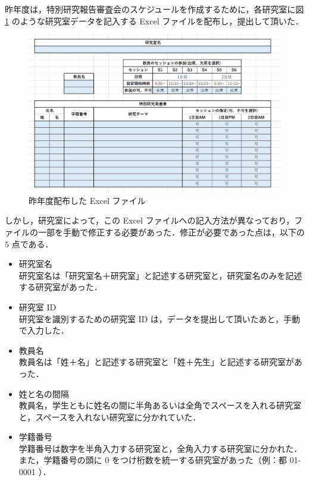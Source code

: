 \documentclass[a4paper,12pt,fleqn]{jarticle}
\begin{document}
昨年度は，特別研究報告審査会のスケジュールを作成するために，各研究室に図 \ref{fig:wakaexcel} のような研究室データを記入する Excel ファイルを配布し，提出して頂いた．
\begin{figure}[H]
  \begin{center}
    \includegraphics[scale=0.8]{wakaexcel.png}
    \caption{昨年度配布した Excel ファイル}
    \label{fig:wakaexcel}
  \end{center}
\end{figure}
しかし，研究室によって，この Excel ファイルへの記入方法が異なっており，ファイルの一部を手動で修正する必要があった．修正が必要であった点は，以下の $5$ 点である．
\begin{itemize}
\item 研究室名\\
研究室名は「研究室名＋研究室」と記述する研究室と，研究室名のみを記述する研究室があった．
\item 研究室 ID\\
研究室を識別するための研究室 ID は，データを提出して頂いたあと，手動で入力した．
\item 教員名\\
教員名は「姓＋名」と記述する研究室と「姓＋先生」と記述する研究室があった．
\item 姓と名の間隔\\
教員名，学生ともに姓名の間に半角あるいは全角でスペースを入れる研究室と，スペースを入れない研究室に分かれていた．
\item 学籍番号\\
学籍番号は数字を半角入力する研究室と，全角入力する研究室に分かれた．また，学籍番号の頭に 0 をつけ桁数を統一する研究室があった（例：都 01-0001 ）．
\end{itemize}
\end{document}
